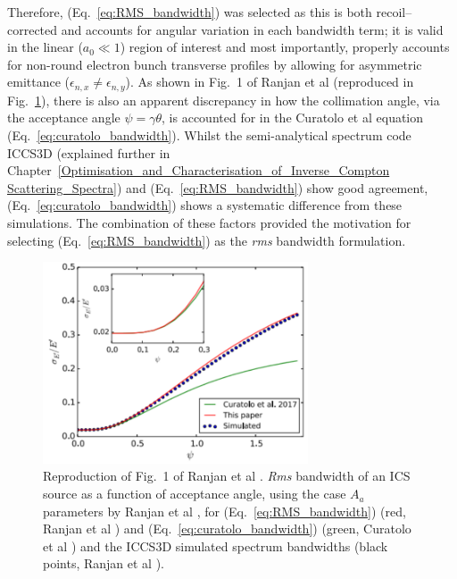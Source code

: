\documentclass[../main.tex]{subfiles}
\begin{document}
Therefore, (Eq.~\ref{eq:RMS_bandwidth}) was selected as this is both recoil--corrected and accounts for angular variation in each bandwidth term; it is valid in the linear ($a_{0}\ll 1$) region of interest and most importantly, properly accounts for non-round electron bunch transverse profiles by allowing for asymmetric emittance ($\epsilon_{n,x}\neq\epsilon_{n,y}$).  As shown in Fig.~1 of Ranjan et al \cite{ranjan2018simulation} (reproduced in Fig.~\ref{fig:curatolo_ranjan_disagreement}), there is also an apparent discrepancy in how the collimation angle, via the acceptance angle $\psi = \gamma\theta$, is accounted for in the Curatolo et al equation (Eq.~\ref{eq:curatolo_bandwidth}). Whilst the semi-analytical spectrum code \textsc{ICCS3D} \cite{krafft2016laser,ranjan2018simulation} (explained further in Chapter~\ref{Optimisation_and_Characterisation_of_Inverse_Compton Scattering_Spectra}) and (Eq.~\ref{eq:RMS_bandwidth}) show good agreement, (Eq.~\ref{eq:curatolo_bandwidth}) shows a systematic difference from these simulations. The combination of these factors provided the motivation for selecting (Eq.~\ref{eq:RMS_bandwidth}) as the \textit{rms} bandwidth formulation.
\begin{figure}[!h]
\centering
\includegraphics[width=0.7\textwidth]{Figures/Photon_Production_by_Inverse_Compton_Scattering/ranjan_curatolo_disagreement.pdf}
\caption{Reproduction of Fig.~1 of Ranjan et al \cite{ranjan2018simulation}. \textit{Rms} bandwidth of an ICS source as a function of acceptance angle, using the case $A_{a}$ parameters by Ranjan et al \cite{ranjan2018simulation}, for (Eq.~\ref{eq:RMS_bandwidth}) (red, Ranjan et al \cite{ranjan2018simulation}) and (Eq.~\ref{eq:curatolo_bandwidth}) (green, Curatolo et al \cite{curatolo2017analytical}) and the \textsc{ICCS3D} simulated spectrum bandwidths (black points, Ranjan et al \cite{ranjan2018simulation}). }
\label{fig:curatolo_ranjan_disagreement}
\end{figure}
\end{document}

